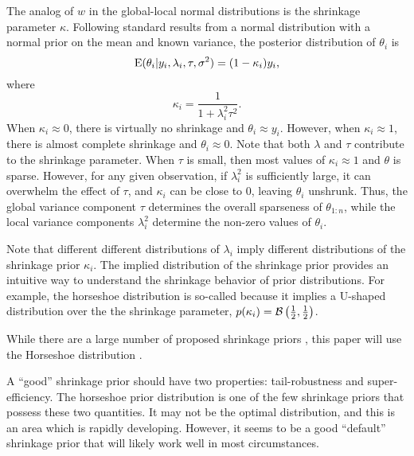\documentclass{article}
\begin{document}
The analog of $w$ in the global-local normal distributions is the shrinkage parameter $\kappa$.
Following standard results from a normal distribution with a normal prior on the mean and known variance, the posterior distribution of $\theta_{i}$ is
\begin{equation}
  \label{eq:11}
  \operatorname{E} ( \theta_{i} | y_{i}, \lambda_{i}, \tau, \sigma^{2} )  = (1 - \kappa_{i}) y_{i} \text{,}
\end{equation}
where
\begin{equation}
  \label{eq:19}
  \kappa_{i} = \frac{1}{1 + \lambda^{2}_{i} \tau^{2}} \text{.}
\end{equation}
When $\kappa_{i} \approx 0$, there is virtually no shrinkage and $\theta_{i} \approx y_{i}$.
However, when $\kappa_{i} \approx 1$, there is almost complete shrinkage and $\theta_{i} \approx 0$.
Note that both $\lambda$ and $\tau$ contribute to the shrinkage parameter.
When $\tau$ is small, then most values of $\kappa_{i} \approx 1$ and $\theta$ is sparse.
However, for any given observation, if $\lambda_{i}^{2}$ is sufficiently large, it can overwhelm the effect of $\tau$, and $\kappa_{i}$ can be close to 0, leaving $\theta_{i}$ unshrunk.
Thus, the global variance component $\tau$ determines the overall sparseness of $\theta_{1:n}$, while the local variance components $\lambda_{i}^{2}$ determine the non-zero values of $\theta_{i}$.

Note that different different distributions of $\lambda_{i}$ imply different distributions of the shrinkage prior $\kappa_{i}$.
The implied distribution of the shrinkage prior provides an intuitive way to understand the shrinkage behavior of prior distributions.
For example, the horseshoe distribution is so-called because it implies a U-shaped distribution over the the shrinkage parameter, $p(\kappa_{i}) = \mathcal{B}\left(\frac{1}{2}, \frac{1}{2}\right)$.

While there are a large number of proposed shrinkage priors \parencites{ArmaganDunsonLee2011}{BrownGriffin2010}{PolsonScott2010}, this paper will use the Horseshoe distribution \parencites{CarvalhoPolsonScott2009}{CarvalhoPolsonScott2010}{PolsonScott2010}{PolsonScott2012}{DattaGhosh2012}.

A ``good'' shrinkage prior should have two properties: tail-robustness and super-efficiency.
The horseshoe prior distribution is one of the few shrinkage priors that possess these two quantities.
It may not be the optimal distribution, and this is an area which is rapidly developing.
However, it seems to be a good ``default'' shrinkage prior that will likely work well in most circumstances.
\end{document}
